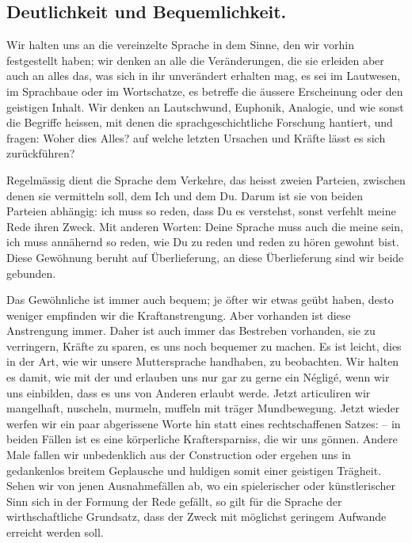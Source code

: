 {\subsection*{Deutlichkeit und Bequemlichkeit.}
Wir halten uns an die vereinzelte Sprache in dem Sinne, den wir vorhin festgestellt haben; wir denken an alle die Veränderungen, die sie erleiden  aber auch an alles das, was sich in ihr unverändert erhalten mag, es sei im Lautwesen, im Sprachbaue oder im Wortschatze, es betreffe die äussere Erscheinung oder den geistigen Inhalt. Wir denken an Lautschwund, Euphonik, Analogie,  und wie sonst die Begriffe heissen, mit denen die sprachgeschichtliche Forschung hantiert, und fragen: Woher dies Alles? auf welche letzten Ursachen und Kräfte lässt es sich zurückführen?

Regelmässig dient die Sprache dem Verkehre, das heisst zweien Parteien, zwischen denen sie vermitteln soll, dem Ich und dem Du. Darum ist sie von beiden Parteien abhängig: ich muss so reden, dass Du es verstehst, sonst verfehlt meine Rede ihren Zweck. Mit anderen Worten: Deine Sprache muss auch \label{sp.182} die meine sein, ich muss annähernd so reden, wie Du zu reden und reden zu hören gewohnt bist. Diese Gewöhnung beruht auf Überlieferung, an diese Überlieferung sind wir beide gebunden.

Das Gewöhnliche ist immer auch bequem; je öfter wir etwas geübt haben, desto weniger empfinden wir die Kraftanstrengung. Aber vorhanden ist diese Anstrengung immer. Daher ist auch immer das Bestreben vorhanden, sie zu verringern, Kräfte zu sparen, es uns noch bequemer zu machen. Es ist leicht, dies in der Art, wie wir unsere Muttersprache handhaben, zu beobachten. Wir halten es damit, wie mit der  und erlauben uns nur gar zu gerne ein Négligé, wenn wir uns einbilden, dass es uns von Anderen erlaubt werde. Jetzt articuliren wir mangelhaft, nuscheln, murmeln, muffeln mit träger Mundbewegung. Jetzt wieder werfen wir ein paar abgerissene Worte hin statt eines rechtschaffenen Satzes: – in beiden Fällen ist es eine körperliche Kraftersparniss, die wir uns gönnen. Andere Male fallen wir unbedenklich aus der Construction oder ergehen uns in gedankenlos breitem Geplausche \label{fp.192} und huldigen somit einer geistigen Trägheit. Sehen wir von jenen Ausnahmefällen ab, wo ein spielerischer oder künstlerischer Sinn sich in der Formung der Rede gefällt, so gilt für die Sprache der wirthschaftliche Grundsatz, dass der Zweck mit möglichst geringem Aufwande erreicht werden soll.

}
